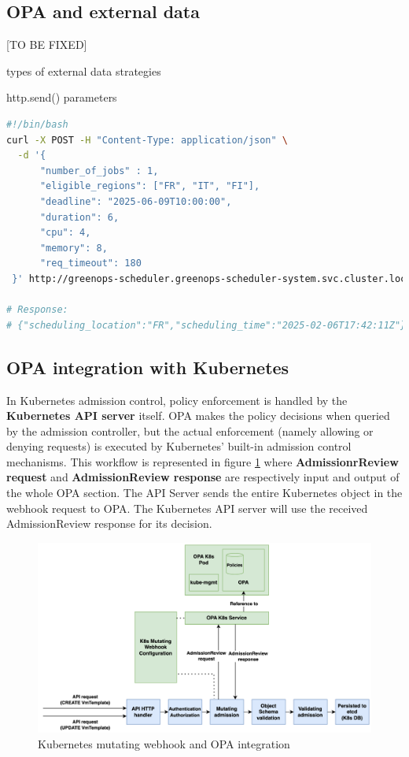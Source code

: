 \subsection{OPA and external data}

[TO BE FIXED]

types of external data strategies

http.send()
parameters

\begin{lstlisting}[language=sh, caption={Shell Script Example}, label={lst:shellscript}]
#!/bin/bash
curl -X POST -H "Content-Type: application/json" \
  -d '{
      "number_of_jobs" : 1,
      "eligible_regions": ["FR", "IT", "FI"],
      "deadline": "2025-06-09T10:00:00",
      "duration": 6,
      "cpu": 4,
      "memory": 8,
      "req_timeout": 180
 }' http://greenops-scheduler.greenops-scheduler-system.svc.cluster.local/scheduling

# Response: 
# {"scheduling_location":"FR","scheduling_time":"2025-02-06T17:42:11Z"}
\end{lstlisting}

\subsection{OPA integration with Kubernetes}

In Kubernetes admission control, policy enforcement is handled by the \textbf{Kubernetes API server} itself. OPA makes the policy decisions when queried by the admission controller, but the actual enforcement (namely allowing or denying requests) is executed by Kubernetes' built-in admission control mechanisms. This workflow is represented in figure \ref{fig:webhook_opa} where \textbf{AdmissionrReview request} and \textbf{AdmissionReview response} are respectively input and output of the whole OPA section. The API Server sends the entire Kubernetes object in the webhook request to OPA. %
The Kubernetes API server will use the received AdmissionReview response for its decision. \\


\begin{figure}[htb]
\centering
\includegraphics[width=1\linewidth]{images/webhook.png}
\caption{Kubernetes mutating webhook and OPA integration}
\label{fig:webhook_opa}
\end{figure}

